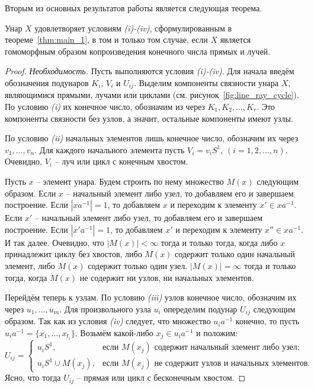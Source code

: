 \documentclass[11pt,twoside,final
]{article}
\begin{document}
Вторым из основных результатов работы является следующая теорема.
\begin{theorem} \label{thm:main_2}
	Унар $X$ удовлетворяет условиям \textit{(i)-(iv)}, сформулированным в теореме~\ref{thm:main_1}, в том и только том случае, если $X$ является гомоморфным образом копроизведения конечного числа прямых и лучей.
\end{theorem}
\begin{proof}
	\textit{Необходимость.}
	Пусть выполняются условия \textit{(i)-(iv)}.
	Для начала введём обозначения подунаров $K_i$, $V_i$ и $U_{ij}$.
	Выделим компоненты связности унара $X$, являющимися прямыми, лучами или циклами (см. рисунок~\ref{fig:line_ray_cycle}).
	По условию \textit{(i)} их конечное число, обозначим из через $K_1, K_2, \ldots, K_r$.
	Это компоненты связности без узлов, а значит, остальные компоненты имеют узлы.

	По условию \textit{(ii)} начальных элементов лишь конечное число, обозначим их через $v_1,\ldots, v_n$.
	Для каждого начального элемента пусть $V_i = v_i S^1$, $(i=1,2,\ldots,n)$.
	Очевидно, $V_i$ -- луч или цикл с конечным хвостом.

	Пусть $x$ -- элемент унара.
	Будем строить по нему множество $M(x)$ следующим образом.
	Если $x$ -- начальный элемент либо узел, то добавляем его и завершаем построение.
	Если $|xa^{-1}| = 1$, то добавляем $x$ и переходим к элементу $x' \in x a^{-1}$.
	Если $x'$ -- начальный элемент либо узел, то добавляем его и завершаем построение.
	Если $|x' a^{-1}| = 1$, то добавляем $x'$ и переходим к элементу $x'' \in x a^{-1}$.
	И так далее.
	Очевидно, что $|M(x)| < \infty$ тогда и только тогда, когда либо $x$ принадлежит циклу без хвостов, либо $M(x)$ содержит только один начальный элемент, либо $M(x)$ содержит только один узел.
	$|M(x)| = \infty$ тогда и только тогда, когда $M(x)$ не содержит ни узлов, ни начальных элементов.

	Перейдём теперь к узлам.
	По условию \textit{(iii)} узлов конечное число, обозначим их через $ u_1, \ldots, u_m$.
	Для произвольного узла $u_i$ опеределим подунар $U_{ij}$ следующим образом.
	Так как из условия \textit{(iv)} следует, что множество $u_i a^{-1}$ конечно, то пусть $u_i a^{-1} = \{ x_1, \ldots, x_{t_i} \}$.
	Возьмём какой-либо $x_j \in u_i a^{-1}$ и положим:
	\[
		U_{ij} =
		\begin{cases}
			u_i S^1,             & \text{если } M(x_j) \text{ содержит начальный элемент либо узел};    \\
			u_i S^1 \cup M(x_j), & \text{если } M(x_j) \text{ не содержит узлов и начальных элементов}.
		\end{cases}
	\]
	Ясно, что тогда $U_{ij}$ -- прямая или цикл с бесконечным хвостом.


\end{proof}
\end{document}
